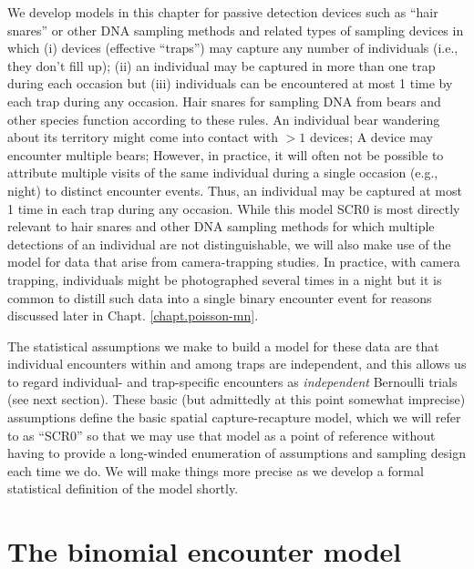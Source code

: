We develop models in this chapter for passive detection devices such
as ``hair snares'' or other DNA sampling methods
\citep{kery_etal:2010, gardner_etal:2010jwm} and related types of
sampling devices in which (i) devices (effective ``traps'') may
capture any number of individuals (i.e., they don't fill up); (ii) an
individual may be captured in more than one trap during each occasion
but (iii) individuals can be encountered at most 1 time by each trap
during any occasion.  Hair snares for sampling DNA from bears and
other species function according to these rules. An individual bear
wandering about its territory might come into contact with $>1$
devices; A device may encounter multiple bears; However, in practice,
it will often not be possible to attribute multiple visits of the same
individual during a single occasion (e.g., night) to distinct
encounter events. Thus, an individual may be captured at most 1 time
in each trap during any occasion.  While this model SCR0 is most
directly relevant to hair snares and other DNA sampling methods for
which multiple detections of an individual are not distinguishable, we
will also make use of the model for data that arise from
camera-trapping studies. In practice, with camera trapping,
individuals might be photographed several times in a night but it is
common to distill such data into a single binary encounter event for
reasons discussed later in Chapt. \ref{chapt.poisson-mn}.

The statistical assumptions we make to build a model for these data
are that individual encounters within and among traps are independent,
and this allows us to regard individual- and trap-specific encounters
as {\it independent} Bernoulli trials (see next section).  These basic
(but admittedly at this point somewhat imprecise) assumptions define
the basic spatial capture-recapture model, which we will refer to as
``SCR0'' so that we may use that model as a point of reference without
having to provide a long-winded enumeration of assumptions and
sampling design each time we do. We will make things more precise as
we develop a formal statistical definition of the model shortly.


\section{The binomial encounter model}
\label{scr0.sec.binomial}

